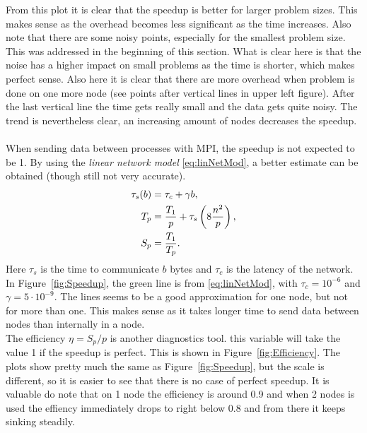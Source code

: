 From this plot it is clear that the speedup is better for larger problem sizes. This makes sense as the overhead becomes less significant as the time increases. Also note that there are some noisy points, especially for the smallest problem size. This was addressed in the beginning of this section. What is clear here is that the noise has a higher impact on small problems as the time is shorter, which makes perfect sense. Also here it is clear that there are more overhead when problem is done on one more node (see points after vertical lines in upper left figure). After the last vertical line the time gets really small and the data gets quite noisy.
The trend is nevertheless clear, an increasing amount of nodes decreases the speedup. \\
\\
When sending data between processes with MPI, the speedup is not expected to be 1. By using the \textit{linear network model} \eqref{eq:linNetMod}, a better estimate can be obtained (though still not very accurate).
\begin{align}
  \tau_s(b) &= \tau_c + \gamma b, \notag \\
  \label{eq:linNetMod} 
  T_p &= \frac{T_1}{p} + \tau_s \left(  8 \frac{n^2}{p}\right), \\
  S_p &= \frac{T_1}{T_p}. \notag 
\end{align}
Here $\tau_s$ is the time to communicate $b$ bytes and $\tau_c$ is the latency of the network. In Figure~\ref{fig:Speedup}, the green line is from \eqref{eq:linNetMod}, with $\tau_c = 10^{-6}$ and $\gamma = 5 \cdot 10^{-9}$. The lines seems to be a good approximation for one node, but not for more than one. This makes sense as it takes longer time to send data between nodes than internally in a node.
\\
The efficiency $\eta = S_p/p $ is another diagnostics tool. this variable will take the value 1 if the speedup is perfect. This is shown in Figure~\ref{fig:Efficiency}. The plots show pretty much the same as Figure~\ref{fig:Speedup}, but the scale is different, so it is easier to see that there is no case of perfect speedup. It is valuable do note that on 1 node the efficiency is around 0.9 and when 2 nodes is used the effiency immediately drops to right below 0.8 and from there it keeps sinking steadily. 
\\
